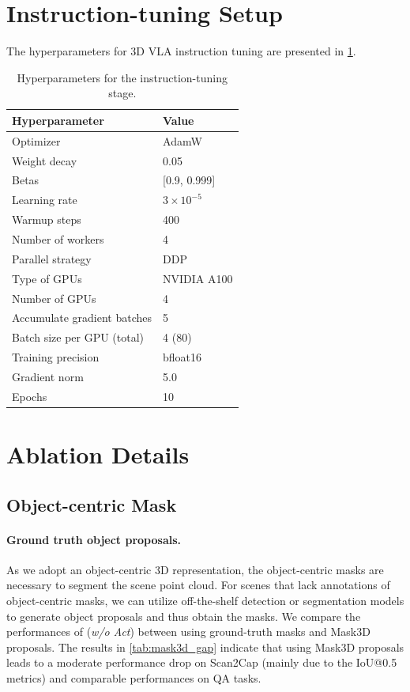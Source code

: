 \section{Instruction-tuning Setup}
The hyperparameters for 3D VLA instruction tuning are presented in \cref{tab:param_sft}.
\begin{table}[t!]
\centering
\small
\caption{Hyperparameters for the instruction-tuning stage.} \label{tab:param_sft}
\begin{tabular}{@{}ll@{}}
\toprule
\textbf{Hyperparameter}  & \textbf{Value}   \\ \midrule
Optimizer                & AdamW     \\
Weight decay             & 0.05     \\
Betas                    & [0.9, 0.999]      \\
Learning rate            & $3\times 10^{-5}$ \\
Warmup steps             & 400      \\
Number of workers        & 4         \\
Parallel strategy        & DDP       \\
Type of GPUs             & NVIDIA A100       \\
Number of GPUs           & 4 \\
Accumulate gradient batches & 5      \\
Batch size per GPU (total)   & 4 (80)    \\ 
Training precision       & bfloat16      \\
Gradient norm            & 5.0        \\
Epochs                   &  10        \\
\bottomrule
\end{tabular}
\end{table}

\section{Ablation Details}\label{sec:supp_ablation}



\subsection{Object-centric Mask}
\paragraph{Ground truth \vs object proposals.} As we adopt an object-centric 3D representation, the object-centric masks are necessary to segment the scene point cloud. For scenes that lack annotations of object-centric masks, we can utilize off-the-shelf detection or segmentation models to generate object proposals and thus obtain the masks. We compare the performances of \agent (\textit{w/o Act}) between using ground-truth masks and Mask3D \citep{schult2022mask3d} proposals. The results in \cref{tab:mask3d_gap} indicate that using Mask3D proposals leads to a moderate performance drop on Scan2Cap (mainly due to the IoU@0.5 metrics) and comparable performances on QA tasks.

